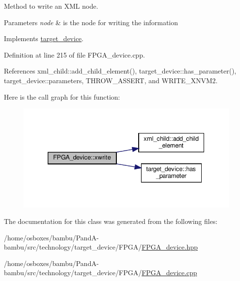 Method to write an X\+ML node. 


\begin{DoxyParams}{Parameters}
{\em node} & is the node for writing the information \\
\hline
\end{DoxyParams}


Implements \hyperlink{classtarget__device_adddcd8f3eed98d93007b4ebc68be2f82}{target\+\_\+device}.



Definition at line 215 of file F\+P\+G\+A\+\_\+device.\+cpp.



References xml\+\_\+child\+::add\+\_\+child\+\_\+element(), target\+\_\+device\+::has\+\_\+parameter(), target\+\_\+device\+::parameters, T\+H\+R\+O\+W\+\_\+\+A\+S\+S\+E\+RT, and W\+R\+I\+T\+E\+\_\+\+X\+N\+V\+M2.

Here is the call graph for this function\+:
\nopagebreak
\begin{figure}[H]
\begin{center}
\leavevmode
\includegraphics[width=331pt]{db/dd5/classFPGA__device_afc6da3ca7ff26af47400272956f6c397_cgraph}
\end{center}
\end{figure}


The documentation for this class was generated from the following files\+:\begin{DoxyCompactItemize}
\item 
/home/osboxes/bambu/\+Pand\+A-\/bambu/src/technology/target\+\_\+device/\+F\+P\+G\+A/\hyperlink{FPGA__device_8hpp}{F\+P\+G\+A\+\_\+device.\+hpp}\item 
/home/osboxes/bambu/\+Pand\+A-\/bambu/src/technology/target\+\_\+device/\+F\+P\+G\+A/\hyperlink{FPGA__device_8cpp}{F\+P\+G\+A\+\_\+device.\+cpp}\end{DoxyCompactItemize}
